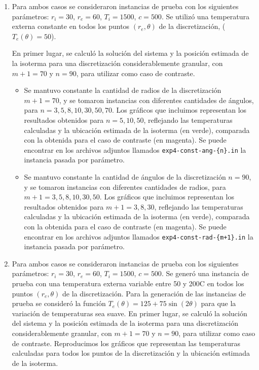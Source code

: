        \begin{enumerate}[label=(\roman*)]
          \item {}

            Para ambos casos se consideraron instancias de prueba con los siguientes parámetros: $r_i = 30$, $r_e = 60$, $T_i = 1500$, $c = 500$. Se utilizó una temperatura externa constante en todos los puntos $(r_e, \theta)$ de la discretización, ($T_e(\theta) = 50$). 

            En primer lugar, se calculó la solución del sistema y la posición estimada de la isoterma para una discretización considerablemente granular, con $m + 1 = 70$ y $n = 90$, para utilizar como caso de contraste. 

            \begin{itemize}
              \item {} Se mantuvo constante la cantidad de radios de la discretización $m + 1 = 70$, y se tomaron instancias con diferentes cantidades de ángulos, para $n = 3, 5, 8, 10, 30, 50, 70$. Los gráficos que incluimos representan los resultados obtenidos para $n = 5, 10, 50$, reflejando las temperaturas calculadas y la ubicación estimada de la isoterma (en verde), comparada con la obtenida para el caso de contraste (en magenta). Se puede encontrar en los archivos adjuntos llamados \texttt{exp4-const-ang-\{n\}.in} la instancia pasada por parámetro.

              \item {} Se mantuvo constante la cantidad de ángulos de la discretización $n = 90$, y se tomaron instancias con diferentes cantidades de radios, para $m + 1 = 3, 5, 8, 10, 30, 50$. Los gráficos que incluimos representan los resultados obtenidos para $m + 1 = 3, 8, 30$, reflejando las temperaturas calculadas y la ubicación estimada de la isoterma (en verde), comparada con la obtenida para el caso de contraste (en magenta). Se puede encontrar en los archivos adjuntos llamados \texttt{exp4-const-rad-\{m+1\}.in} la instancia pasada por parámetro.
            \end{itemize}

          \item {}

            Para ambos casos se consideraron instancias de prueba con los siguientes parámetros: $r_i = 30$, $r_e = 60$, $T_i = 1500$, $c = 500$. Se generó una instancia de prueba con una temperatura externa variable entre 50 y 200{\degree}C en todos los puntos $(r_e, \theta)$ de la discretización. 
            Para la generación de las instancias de prueba se consideró la función $T_e(\theta) = 125 + 75 \sin(2\theta)$ para que la variación de temperaturas sea suave.
            En primer lugar, se calculó la solución del sistema y la posición estimada de la isoterma para una discretización considerablemente granular, con $m + 1 = 70$ y $n = 90$, para utilizar como caso de contraste. Reproducimos los gráficos que representan las temperaturas calculadas para todos los puntos de la discretización y la ubicación estimada de la isoterma.


\end{enumerate}

